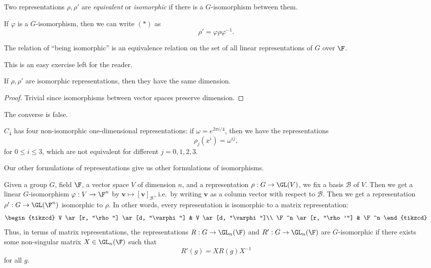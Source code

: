 \documentclass[a4paper]{article}
\begin{document}
\begin{defi}
  Two representations $\rho, \rho'$ are \emph{equivalent} or \emph{isomorphic} if there is a $G$-isomorphism between them.
\end{defi}

If $\varphi$ is a $G$-isomorphism, then we can write $(*)$ as
\[
  \rho' = \varphi \rho \varphi^{-1}.\tag{$\dagger$}
\]
\begin{lemma}
  The relation of ``being isomorphic'' is an equivalence relation on the set of all linear representations of $G$ over $\F$.
\end{lemma}
This is an easy exercise left for the reader.

\begin{lemma}
  If $\rho, \rho'$ are isomorphic representations, then they have the same dimension.
\end{lemma}

\begin{proof}
  Trivial since isomorphisms between vector spaces preserve dimension.
\end{proof}

The converse is false.
\begin{eg}
  $C_4$ has four non-isomorphic one-dimensional representations: if $\omega = e^{2 \pi i/4}$, then we have the representations
  \[
    \rho_j (x^i) = \omega^{ij},
  \]
  for $0 \leq i \leq 3$, which are not equivalent for different $j = 0, 1, 2, 3$.
\end{eg}
Our other formulations of representations give us other formulations of isomorphisms.

Given a group $G$, field $\F$, a vector space $V$ of dimension $n$, and a representation $\rho: G \to \GL(V)$, we fix a basis $\mathcal{B}$ of $V$. Then we get a linear $G$-isomorphism $\varphi: V \to \F^n$ by $\mathbf{v} \mapsto [\mathbf{v}]_{\mathcal{B}}$, i.e.\ by writing $\mathbf{v}$ as a column vector with respect to $\mathcal{B}$. Then we get a representation $\rho': G \to \GL(\F^n)$ isomorphic to $\rho$. In other words, every representation is isomorphic to a matrix representation:
\[
  \begin{tikzcd}
    V \ar[r, "\rho"] \ar[d, "\varphi"] & V \ar[d, "\varphi"]\\
    \F^n \ar[r, "\rho'"] & \F^n
  \end{tikzcd}
\]
Thus, in terms of matrix representations, the representations $R: G \to \GL_n(\F)$ and $R': G \to \GL_n(\F)$ are $G$-isomorphic if there exists some non-singular matrix $X \in \GL_n(\F)$ such that
\[
  R'(g) = X R(g) X^{-1}
\]
for all $g$.
\end{document}
